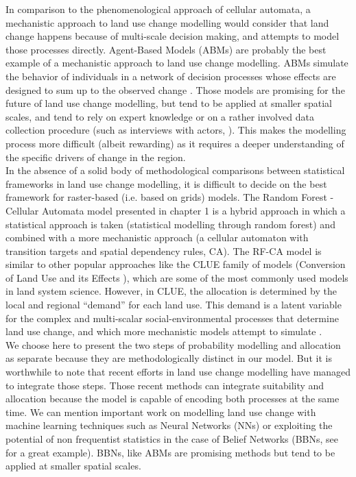 \documentclass[12pt,Bold,TexShade]{thesis/mcgilletdclass}
\begin{document}
{In comparison to the phenomenological approach of cellular automata, a mechanistic approach to land use change modelling would consider that land change happens because of multi-scale decision making, and attempts to model those processes directly. Agent-Based Models (ABMs) are probably the best example of a mechanistic approach to land use change modelling. ABMs simulate the behavior of individuals in a network of decision processes whose effects are designed to sum up to the observed change \citep{parker_agent-based_2002, filatova_spatial_2013}. Those models are promising for the future of land use change modelling, but tend to be applied at smaller spatial scales, and tend to rely on expert knowledge or on a rather involved data collection procedure (such as interviews with actors, \cite{taylor_agent-based_2016}). This makes the modelling process more difficult (albeit rewarding) as it requires a deeper understanding of the specific drivers of change in the region. \\

In the absence of a solid body of methodological comparisons between statistical frameworks in land use change modelling, it is difficult to decide on the best framework for raster-based (i.e. based on grids) models. The Random Forest - Cellular Automata model presented in chapter 1 is a  hybrid approach in which a statistical approach is taken (statistical modelling through random forest) and combined with a more mechanistic approach (a cellular automaton with transition targets and spatial dependency rules, CA). The RF-CA model is similar to other popular approaches like the CLUE family of models (Conversion of Land Use and its Effects \cite{verburg_modeling_2002, verburg_combining_2009}), which are some of the most commonly used models in land system science. However, in CLUE, the allocation is determined by the local and regional “demand” for each land use. This demand is a latent variable for the complex and multi-scalar social-environmental processes that determine land use change, and which more mechanistic models attempt to simulate \citep{verburg_combining_2009}. \\

We choose here to present the two steps of probability modelling and allocation as separate because they are methodologically distinct in our model. But it is worthwhile to note that recent efforts in land use change modelling have managed to integrate those steps. Those recent methods can integrate suitability and allocation because the model is capable of encoding both processes at the same time. We can mention important work on modelling land use change with machine learning techniques such as Neural Networks (NNs) \citep{tayyebi_simulating_2013} or exploiting the potential of non frequentist statistics in the case of Belief Networks (BBNs, see \cite{celio_modeling_2014} for a great example). BBNs, like ABMs are promising methods but tend to be applied at smaller spatial scales. \\

}
\end{document}
